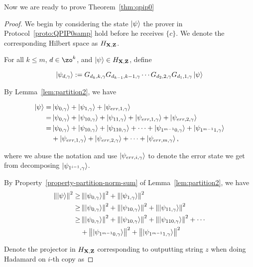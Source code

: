 Now we are ready to prove Theorem~\ref{thm:qpip0}
\begin{proof}
We begin by considering the state $\ket{\psi}$ the prover in Protocol~\ref{proto:QPIP0samp} hold before he receives $\{c\}$. We denote the corresponding Hilbert space as $H_{\mathbf{X},\mathbf{Z}}$.


For all $k\leq m$, $d\in \zo^k$, and $\ket{\psi} \in H_{\mathbf{X},\mathbf{Z}}$, define

$$\ket{\psi_{d,\gamma}}:= G_{d_k,k,\gamma}G_{d_{k-1},k-1,\gamma}\cdots G_{d_2,2,\gamma} G_{d_1,1,\gamma} \ket{\psi}$$

By Lemma~\ref{lem:partition2}, we have  

\begin{align} \label{eq:partition-string}
    \ket{\psi} =& \ket{\psi_{0,\gamma}}+\ket{\psi_{1,\gamma}}+\ket{\psi_{err,1,\gamma}} \nonumber \\
    =& \ket{\psi_{0,\gamma}}+\ket{\psi_{10,\gamma}}+\ket{\psi_{11,\gamma}}+\ket{\psi_{err,1,\gamma}}+\ket{\psi_{err,2,\gamma}} \nonumber \\
    =& \ket{\psi_{0,\gamma}}+\ket{\psi_{10,\gamma}}+\ket{\psi_{110,\gamma}}+\cdots+\ket{\psi_{1^{m-1}0,\gamma}}+\ket{\psi_{1^{m-1}1,\gamma}} \nonumber \\
    &+\ket{\psi_{err,1,\gamma}}+\ket{\psi_{err,2,\gamma}}+\cdots+\ket{\psi_{err,m,\gamma}}, 
\end{align}

where we abuse the notation and use $\ket{\psi_{err,i,\gamma}}$ to denote the error state we get from decomposing $\ket{\psi_{1^{i-1},\gamma}}$.

By Property~\ref{property-partition-norm-sum} of Lemma~\ref{lem:partition2}, we have
\begin{align} \label{eq:bad-term-sum}
    \left\lVert\ket{\psi}\right\rVert^2 \geq& \left\lVert\ket{\psi_{0,\gamma}}\right\rVert^2+\left\lVert\ket{\psi_{1,\gamma}}\right\rVert^2 \nonumber \\
    \geq& \left\lVert\ket{\psi_{0,\gamma}}\right\rVert^2+
    \left\lVert\ket{\psi_{10,\gamma}}\right\rVert^2+ \left\lVert\ket{\psi_{11,\gamma}}\right\rVert^2 \nonumber \\
    \geq& \left\lVert\ket{\psi_{0,\gamma}}\right\rVert^2+
    \left\lVert\ket{\psi_{10,\gamma}}\right\rVert^2+ \left\lVert\ket{\psi_{110,\gamma}}\right\rVert^2 +\cdots  \nonumber \\
    &+ \left\lVert\ket{\psi_{1^{m-1}0,\gamma}}\right\rVert^2+ \left\lVert\ket{\psi_{1^{m-1}1,\gamma}}\right\rVert^2
\end{align}

Denote the projector in $H_{\mathbf{X},\mathbf{Z}}$ corresponding to outputting string $z$ when doing Hadamard on $i$-th copy as


\end{proof}
